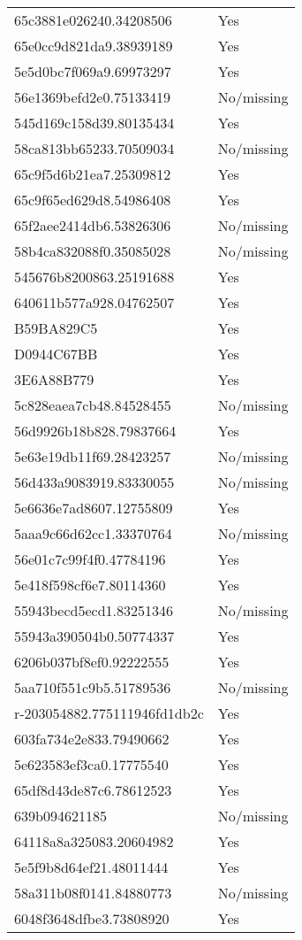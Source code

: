 \begin{tabular}{ll}
65c3881e026240.34208506 & Yes \\
65e0cc9d821da9.38939189 & Yes \\
5e5d0bc7f069a9.69973297 & Yes \\
56e1369befd2e0.75133419 & No/missing \\
545d169c158d39.80135434 & Yes \\
58ca813bb65233.70509034 & No/missing \\
65c9f5d6b21ea7.25309812 & Yes \\
65c9f65ed629d8.54986408 & Yes \\
65f2aee2414db6.53826306 & No/missing \\
58b4ca832088f0.35085028 & No/missing \\
545676b8200863.25191688 & Yes \\
640611b577a928.04762507 & Yes \\
B59BA829C5 & Yes \\
D0944C67BB & Yes \\
3E6A88B779 & Yes \\
5c828eaea7cb48.84528455 & No/missing \\
56d9926b18b828.79837664 & Yes \\
5e63e19db11f69.28423257 & No/missing \\
56d433a9083919.83330055 & No/missing \\
5e6636e7ad8607.12755809 & Yes \\
5aaa9c66d62cc1.33370764 & No/missing \\
56e01c7c99f4f0.47784196 & Yes \\
5e418f598cf6e7.80114360 & Yes \\
55943becd5ecd1.83251346 & No/missing \\
55943a390504b0.50774337 & Yes \\
6206b037bf8ef0.92222555 & Yes \\
5aa710f551c9b5.51789536 & No/missing \\
r-203054882.775111946fd1db2c & Yes \\
603fa734e2e833.79490662 & Yes \\
5e623583ef3ca0.17775540 & Yes \\
65df8d43de87c6.78612523 & Yes \\
639b094621185 & No/missing \\
64118a8a325083.20604982 & Yes \\
5e5f9b8d64ef21.48011444 & Yes \\
58a311b08f0141.84880773 & No/missing \\
6048f3648dfbe3.73808920 & Yes \\

\end{tabular}
